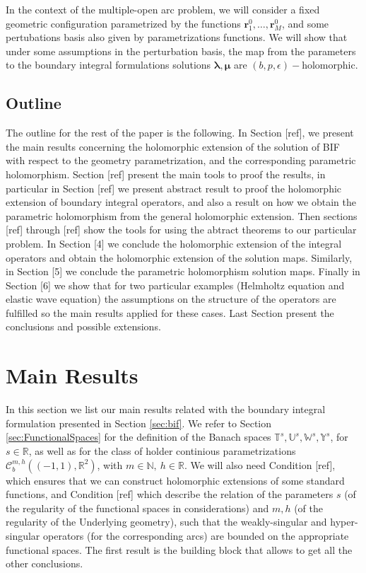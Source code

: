 \documentclass{article}
\newcommand{\todo}[1]{{\color{red}[#1]}}
\newcommand{\bmu} {\bm{\mu}}
\newcommand{\IN}{{\mathbb N}}
\newcommand{\IR}{{\mathbb R}}
\newcommand{\IU}{{\mathbb U}}
\newcommand{\IT}{{\mathbb T}}
\newcommand{\IW}{{\mathbb W}}
\newcommand{\IY}{{\mathbb Y}}
\newcommand{\rgeoh}[2]{\mathcal{C}_b^{#1,#2}\left( (-1,1), \IR^2 \right)}
\newcommand{\bla}{\boldsymbol \lambda}
\newcommand{\br}{\bm{r}}
\begin{document}
In the context of the multiple-open arc problem, we will consider a fixed geometric configuration parametrized by the functions $\br_1^0 ,\hdots, \br_M^0$, and some pertubations basis also given by parametrizations functions. We will show that under some assumptions in the perturbation basis, the map from the parameters to the boundary integral formulations solutions $\bla,\bmu$ are $(b,p,\epsilon)-$holomorphic.
\subsection{Outline}
The outline for the rest of the paper is the following. In Section \todo{ref}, we present the main results concerning the holomorphic extension of the solution of BIF with respect to the geometry parametrization, and the corresponding parametric holomorphism. Section \todo{ref} present the main tools to proof the results, in particular in Section \todo{ref} we present abstract result to proof the holomorphic extension of boundary integral operators, and also a result on how we obtain the parametric holomorphism from the general holomorphic extension. Then sections \todo{ref} through \todo{ref} show the tools for using the abtract theorems to our particular problem. 
In Section \todo{4} we conclude the holomorphic extension of the integral operators and obtain the holomorphic extension of the solution maps. Similarly, in Section \todo{5} we conclude the parametric holomorphism  solution maps. 
Finally in Section \todo{6} we show that for two particular examples (Helmholtz equation and elastic wave equation) the assumptions on the structure of the operators are fulfilled so the main results applied for these cases. Last Section present the conclusions and possible extensions. 
\section{Main Results}
\label{sec:MainResult}
In this section we list our main results related with the boundary integral formulation presented in Section \ref{sec:bif}. We refer to Section \ref{sec:FunctionalSpaces} for the definition of the Banach spaces $\IT^s,\IU^s,\IW^s,\IY^s$, for $s \in \IR$, as well as for the class of holder continious parametrizations $\rgeoh{m}{h}$, with $m \in \IN, \ h\in \IR$. We will also need Condition \todo{ref}, which ensures that we can construct holomorphic extensions of some standard functions, and Condition \todo{ref} which describe the relation of the parameters $s$ (of the regularity of the functional spaces in considerations) and $m,h$ (of the regularity of the Underlying geometry), such that the weakly-singular and hyper-singular operators (for the corresponding arcs) are bounded on the appropriate functional spaces. The first result is the building block that allows to get all the other conclusions.
\end{document}
